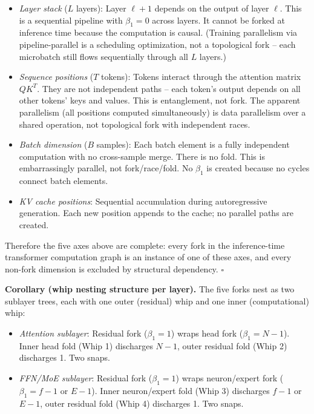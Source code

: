 \documentclass[
  11pt,
]{article}
\providecommand{\tightlist}{%
  \setlength{\itemsep}{0pt}\setlength{\parskip}{0pt}}
\begin{document}
\begin{itemize}
\tightlist
\item
  \emph{Layer stack} (\(L\) layers): Layer \(\ell + 1\) depends on the
  output of layer \(\ell\). This is a sequential pipeline with
  \(\beta_1 = 0\) across layers. It cannot be forked at inference time
  because the computation is causal. (Training parallelism via
  pipeline-parallel is a scheduling optimization, not a topological fork
  -- each microbatch still flows sequentially through all \(L\) layers.)
\item
  \emph{Sequence positions} (\(T\) tokens): Tokens interact through the
  attention matrix \(QK^T\). They are not independent paths -- each
  token's output depends on all other tokens' keys and values. This is
  entanglement, not fork. The apparent parallelism (all positions
  computed simultaneously) is data parallelism over a shared operation,
  not topological fork with independent races.
\item
  \emph{Batch dimension} (\(B\) samples): Each batch element is a fully
  independent computation with no cross-sample merge. There is no fold.
  This is embarrassingly parallel, not fork/race/fold. No \(\beta_1\) is
  created because no cycles connect batch elements.
\item
  \emph{KV cache positions}: Sequential accumulation during
  autoregressive generation. Each new position appends to the cache; no
  parallel paths are created.
\end{itemize}

Therefore the five axes above are complete: every fork in the
inference-time transformer computation graph is an instance of one of
these axes, and every non-fork dimension is excluded by structural
dependency. \(\square\)

\textbf{Corollary (whip nesting structure per layer).} The five forks
nest as two sublayer trees, each with one outer (residual) whip and one
inner (computational) whip:

\begin{itemize}
\tightlist
\item
  \emph{Attention sublayer}: Residual fork (\(\beta_1 = 1\)) wraps head
  fork (\(\beta_1 = N - 1\)). Inner head fold (Whip 1) discharges
  \(N - 1\), outer residual fold (Whip 2) discharges 1. Two snaps.
\item
  \emph{FFN/MoE sublayer}: Residual fork (\(\beta_1 = 1\)) wraps
  neuron/expert fork (\(\beta_1 = f - 1\) or \(E - 1\)). Inner
  neuron/expert fold (Whip 3) discharges \(f - 1\) or \(E - 1\), outer
  residual fold (Whip 4) discharges 1. Two snaps.
\end{itemize}
\end{document}
